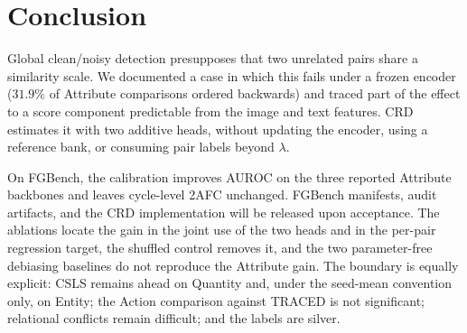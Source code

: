 \section{Conclusion}
\label{sec:conclusion}

Global clean/noisy detection presupposes that two unrelated pairs share a similarity
scale. We documented a case in which this fails under a frozen encoder ($31.9\%$ of
Attribute comparisons ordered backwards) and traced part of the effect to a score
component predictable from the image and text features. CRD estimates it with two
additive heads, without updating the encoder, using a reference bank, or consuming
pair labels beyond $\lambda$.

On FGBench, the calibration improves AUROC on the three reported Attribute backbones
and leaves cycle-level 2AFC unchanged. FGBench manifests, audit artifacts, and the
CRD implementation will be released upon acceptance. The ablations locate the gain in the joint
use of the two heads and in the per-pair regression target, the shuffled control
removes it, and the two parameter-free debiasing baselines do not reproduce the
Attribute gain. The boundary is equally explicit: CSLS remains ahead on Quantity and,
under the seed-mean convention only, on Entity; the Action comparison against TRACED
is not significant; relational conflicts remain difficult; and the labels are silver.
